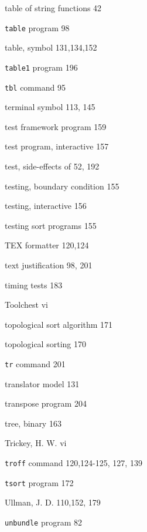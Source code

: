 \begin{multicols}{3}
\hangindent=3pc  table of string functions 42

\hangindent=3pc  \verb'table' program 98

\hangindent=3pc  table, symbol 131,134,152

\hangindent=3pc  \verb'table1' program 196

\hangindent=3pc  \verb'tbl' command 95

\hangindent=3pc  terminal symbol 113, 145

\hangindent=3pc  test framework program 159

\hangindent=3pc  test program, interactive 157

\hangindent=3pc  test, side-effects of 52, 192

\hangindent=3pc  testing, boundary condition 155

\hangindent=3pc  testing, interactive 156

\hangindent=3pc  testing sort programs 155

\hangindent=3pc  TEX formatter 120,124

\hangindent=3pc  text justification 98, 201

\hangindent=3pc  timing tests 183

\hangindent=3pc  Toolchest vi

\hangindent=3pc  topological sort algorithm 171

\hangindent=3pc  topological sorting 170

\hangindent=3pc  \verb'tr' command 201

\hangindent=3pc  translator model 131

\hangindent=3pc  transpose program 204

\hangindent=3pc  tree, binary 163

\hangindent=3pc  Trickey, H. W. vi

\hangindent=3pc  \verb'troff' command 120,124-125, 127, 139

\hangindent=3pc  \verb'tsort' program 172





\hangindent=3pc  Ullman, J. D. 110,152, 179

\hangindent=3pc  \verb'unbundle' program 82


\end{multicols}
